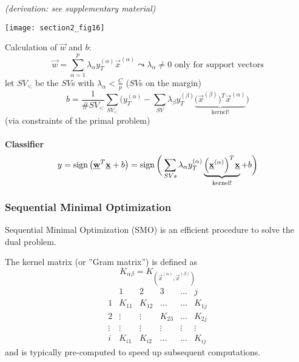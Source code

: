 {\it (derivation: see supplementary material)}
\begin{center} \texttt{[image: section2\_fig16]} \end{center}
Calculation of $\vec{w}$ and $b$:
\begin{equation}
	\vec{w} = \sum\limits_{\alpha = 1}^p \lambda_\alpha y_T^{(\alpha)}
		\vec{x}^{(\alpha)} 
	\leadsto \lambda_\alpha \neq 0 \text{ only for support vectors}
\end{equation}
let $SV_<$ be the $SV$s with $\lambda_\alpha < \frac{C}{p}$ ($SV$s on the margin)
\begin{equation}
	b = \frac{1}{\# SV_<} \sum\limits_{SV_<} \bigg( y_T^{(\alpha)}
		- \sum\limits_{SV} \lambda_\beta y_T^{(\beta)} 
		\underbrace{ \Big( \vec{x}^{(\beta)} \Big)^T 
			\vec{x}^{(\alpha)}}_{\text{kernel!}}
		\bigg)
\end{equation}
(via constraints of the primal problem)
\\\\
{\bf Classifier}
\begin{equation}
	y = \operatorname{sign} \big( \underline{\mathbf{w}}^T \underline{\mathbf{x}} + b \big) 
	= \operatorname{sign} \bigg( \sum\limits_{SVs} \lambda_\alpha y_T^{(\alpha)} 
		\underbrace{ \Big( \underline{\mathbf{x}}^{(\alpha)} \Big)^T \underline{\mathbf{x}}}_{
			\text{kernel!}}
		+ b
		\bigg)
\end{equation}


\subsubsection{Sequential Minimal Optimization}\label{sec:sequentialOptim}
Sequential Minimal Optimization (SMO) is an efficient procedure to
solve the dual problem.

The kernel matrix (or ''Gram matrix'') is defined as
\begin{equation} \tag{''Gram matrix''}
	K_{\alpha\beta} = K_{(\vec{x}^{(\alpha)}, \vec{x}^{(\beta)})}
\end{equation}
$$\begin{array}{c|ccccc}
  & 1      & 2      & 3      & \ldots & j      \\
  \hline
  1	& K_{11} & K_{12} & \ldots & \ldots & K_{1j} \\
  2 	& \vdots & \vdots & K_{23} & \ldots & K_{2j} \\
  \vdots 	& \vdots & \vdots & \vdots & \vdots & \vdots \\
  i	& K_{i1} & K_{i2} & \ldots & \ldots & K_{ij}
\end{array}
$$
and is typically pre-computed to speed up subsequent computations.

